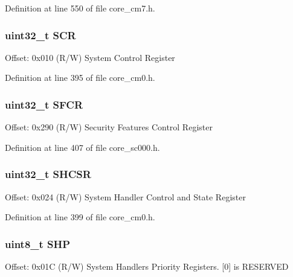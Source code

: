 Definition at line 550 of file core\+\_\+cm7.\+h.

\subsubsection[{\texorpdfstring{S\+CR}{SCR}}]{ uint32\+\_\+t S\+CR}\hypertarget{struct_s_c_b___type_acac65f229cb3fcb5369a0a9e0393b8c0}{}\label{struct_s_c_b___type_acac65f229cb3fcb5369a0a9e0393b8c0}
Offset\+: 0x010 (R/W) System Control Register 

Definition at line 395 of file core\+\_\+cm0.\+h.

\subsubsection[{\texorpdfstring{S\+F\+CR}{SFCR}}]{ uint32\+\_\+t S\+F\+CR}\hypertarget{struct_s_c_b___type_aaddfff3b57de6faf60bfcc938c7229c9}{}\label{struct_s_c_b___type_aaddfff3b57de6faf60bfcc938c7229c9}
Offset\+: 0x290 (R/W) Security Features Control Register 

Definition at line 407 of file core\+\_\+sc000.\+h.

\subsubsection[{\texorpdfstring{S\+H\+C\+SR}{SHCSR}}]{ uint32\+\_\+t S\+H\+C\+SR}\hypertarget{struct_s_c_b___type_a44ad5c292dbd77e72f310902375a8a06}{}\label{struct_s_c_b___type_a44ad5c292dbd77e72f310902375a8a06}
Offset\+: 0x024 (R/W) System Handler Control and State Register 

Definition at line 399 of file core\+\_\+cm0.\+h.

\subsubsection[{\texorpdfstring{S\+HP}{SHP}}]{ uint8\+\_\+t S\+HP}\hypertarget{struct_s_c_b___type_aa043193516e3fc0abbf58ce7cf8cfb4e}{}\label{struct_s_c_b___type_aa043193516e3fc0abbf58ce7cf8cfb4e}
Offset\+: 0x01C (R/W) System Handlers Priority Registers. \mbox{[}0\mbox{]} is R\+E\+S\+E\+R\+V\+ED

